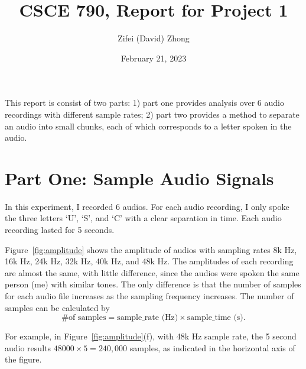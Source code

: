 \documentclass[11pt, oneside]{article}   	%
\title{CSCE 790, Report for Project 1}
\author{Zifei (David) Zhong}
\date{February 21, 2023}							%
\begin{document}
\maketitle

This report is consist of two parts: 1) part one provides analysis over 6 audio recordings with different sample rates; 2) part two provides a method to separate an audio into small chunks, each of which corresponds to a letter spoken in the audio.

\section{Part One: Sample Audio Signals}
In this experiment, I recorded 6 audios. For each audio recording, I only spoke the three letters `U', `S', and `C' with a clear separation in time. Each audio recording lasted for 5 seconds.

Figure~\ref{fig:amplitude} shows the amplitude of audios with sampling rates 8k Hz, 16k Hz, 24k Hz, 32k Hz, 40k Hz, and 48k Hz. The amplitudes of each recording are almost the same, with little difference, since the audios were spoken the same person (me) with similar tones. The only difference is that the number of samples for each audio file increases as the sampling frequency increases. The number of samples can be calculated by $$ \text{\# of samples} = \text{sample\_rate (Hz)} \times \text{sample\_time (s)}.$$ 

For example, in Figure~\ref{fig:amplitude}(f), with 48k Hz sample rate, the 5 second audio results $48000 \times 5 = 240,000$ samples, as indicated in the horizontal axis of the figure.
\end{document}
